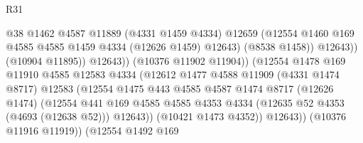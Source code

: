 \begin{lexlean}{R31}
\begin{coremodule}
                                            @38
                                            @1462
                                            @4587
                                            @11889
                                            (@4331 @1459 @4334)
                                            @12659
                                            (@12554
                                              @1460
                                              @169
                                              @4585
                                              @4585
                                              @1459
                                              @4334
                                              (@12626 @1459)
                                              @12643)
                                            (@8538 @1458))
                                          @12643))
                                      (@10904 @11895))
                                    @12643))
                                (@10376 @11902 @11904))
                              (@12554
                                @1478
                                @169
                                @11910
                                @4585
                                @12583
                                @4334
                                (@12612
                                  @1477
                                  @4588
                                  @11909
                                  (@4331 @1474 @8717)
                                  @12583
                                  (@12554
                                    @1475
                                    @443
                                    @4585
                                    @4587
                                    @1474
                                    @8717
                                    (@12626 @1474)
                                    (@12554
                                      @441
                                      @169
                                      @4585
                                      @4585
                                      @4353
                                      @4334
                                      (@12635 @52 @4353 (@4693 (@12638 @52)))
                                      @12643))
                                  (@10421 @1473 @4352))
                                @12643))
                            (@10376 @11916 @11919))
                          (@12554
                            @1492
                            @169

\end{coremodule}
\end{lexlean}
